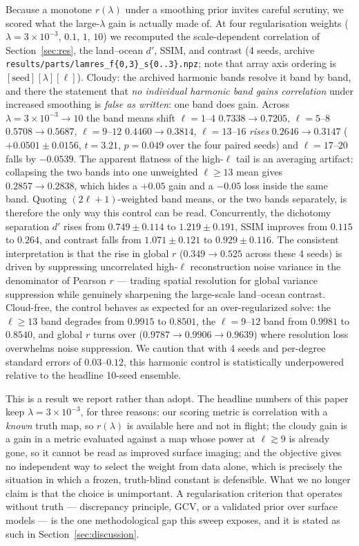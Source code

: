 \documentclass[twocolumn,10pt]{article}
\begin{document}
Because a monotone $r(\lambda)$ under a smoothing prior invites careful scrutiny,
we scored what the large-$\lambda$ gain is actually made of. At four regularisation weights
($\lambda=3\times10^{-3}$, $0.1$, $1$, $10$) we recomputed the scale-dependent
correlation of Section~\ref{sec:res}, the land--ocean $d'$, SSIM, and contrast
(4 seeds, archive {\tt results/parts/lamres\_f\{0,3\}\_s\{0..3\}.npz}; note that array
axis ordering is $[\mathrm{seed}][\lambda][\ell]$). Cloudy: the archived harmonic bands
resolve it band by band, and there the statement that \emph{no individual harmonic band gains
correlation} under increased smoothing is \emph{false as written}: one band does gain. Across
$\lambda=3\times10^{-3}\to10$ the band means shift $\ell=1$--$4$
$0.7338\to0.7205$, $\ell=5$--$8$ $0.5708\to0.5687$, $\ell=9$--$12$ $0.4460\to0.3814$,
$\ell=13$--$16$ \emph{rises} $0.2646\to0.3147$ ($+0.0501\pm0.0156$, $t=3.21$,
$p=0.049$ over the four paired seeds) and $\ell=17$--$20$ falls by $-0.0539$. The
apparent flatness of the high-$\ell$ tail is an averaging artifact: collapsing the two
bands into one unweighted $\ell\ge13$ mean gives $0.2857\to0.2838$, which hides a
$+0.05$ gain and a $-0.05$ loss inside the same band. Quoting
$(2\ell+1)$-weighted band means, or the two bands separately, is therefore the
only way this control can be read. Concurrently, the dichotomy separation $d'$ rises from
$0.749\pm0.114$ to $1.219\pm0.191$, SSIM improves from $0.115$ to $0.264$, and contrast
falls from $1.071\pm0.121$ to $0.929\pm0.116$. The consistent interpretation is that the
rise in global $r$ ($0.349\to0.525$ across these 4 seeds) is driven by suppressing uncorrelated
high-$\ell$ reconstruction noise variance in the denominator of Pearson $r$ --- trading spatial
resolution for global variance suppression while genuinely sharpening the large-scale
land--ocean contrast. Cloud-free, the control behaves as expected for an over-regularized solve:
the $\ell\ge13$ band degrades from $0.9915$ to $0.8501$, the $\ell=9$--$12$ band from
$0.9981$ to $0.8540$, and global $r$ turns over ($0.9787\to0.9906\to0.9639$) where
resolution loss overwhelms noise suppression. We caution that with 4 seeds and per-degree
standard errors of $0.03$--$0.12$, this harmonic control is statistically underpowered
relative to the headline 10-seed ensemble.

This is a result we report rather than adopt. The headline numbers of this
paper keep $\lambda=3\times10^{-3}$, for three reasons: our scoring metric is
correlation with a \emph{known} truth map, so $r(\lambda)$ is available here and
not in flight; the cloudy gain is a gain in a metric evaluated against a map
whose power at $\ell\gtrsim9$ is already gone, so it cannot be read as improved
surface imaging; and the objective gives no independent way to select the weight
from data alone, which is precisely the situation in which a frozen,
truth-blind constant is defensible. What we no longer claim is that the choice
is unimportant. A regularisation criterion that operates without truth ---
discrepancy principle, GCV, or a validated prior over surface models --- is the
one methodological gap this sweep exposes, and it is stated as such in
Section~\ref{sec:discussion}.
\end{document}
